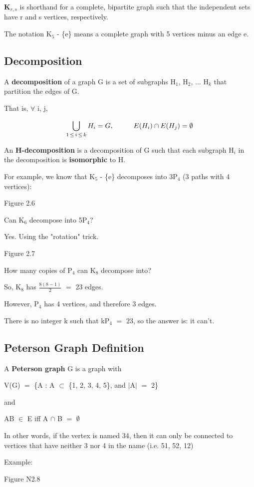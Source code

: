\documentclass{article}
\newcommand{\mt}[1]{\ensuremath{#1}}
\newcommand\ssc[2][\DefaultOpt]{%
  \def\DefaultOpt{#2}%
  \subsection[#1]{#2}%
}
\newcommand{\fa}{\mt{\forall} }          %
\newcommand{\mem}{\mt{\in} }
\newcommand{\es}{\mt{\emptyset} }        %
\newcommand{\sbs}{\mt{\subset} }         %
\newcommand{\av}[1]{\mt{|}#1\mt{|}}  %
\newcommand{\bk}[1]{\{#1\}}
\newcommand{\ms}{\mt{\operatorname{-}} }
\newcommand{\lse}{\mt{\operatorname{\leq}} }
\newcommand{\eql}{ \mt{\operatorname{=}} }
\newcommand{\uw}[2]{#1\mt{_{#2}}}
\newcommand{\frc}[2]{\mt{\frac{#1}{#2}}}
\newcommand{\eqn}[1]{\[#1\]}
\newcommand\tab[1][1cm]{\hspace*{#1}}
\begin{document}
\textbf{\uw{K}{r, s}} is shorthand for a complete, bipartite graph such that the independent sets have r and s vertices, respectively.

The notation \uw{K}{5} \ms \bk{e} means a complete graph with 5 vertices minus an edge e.

\ssc{Decomposition}{

A \textbf{decomposition} of a graph G is a set of subgraphs \uw{H}{1}, \uw{H}{2}, ... \uw{H}{k} that partition the edges of G.

That is, \fa i, j,

\eqn{\bigcup_{1\lse i\lse k}\uw{H}{i} = G,\tab E(H_i) \cap E(H_j) = \es}

An \textbf{H-decomposition} is a decomposition of G such that each subgraph \uw{H}{i} in the decomposition is \textbf{isomorphic} to H.

For example, we know that \uw{K}{5} \ms \bk{e} decomposes into 3\uw{P}{4} (3 paths with 4 vertices):

Figure 2.6

Can \uw{K}{6} decompose into 5\uw{P}{4}?

Yes. Using the "rotation" trick.

Figure 2.7

How many copies of \uw{P}{4} can \uw{K}{8} decompose into?

So, \uw{K}{8} has \frc{8(8 - 1)}{2} \eql 23 edges.

However, \uw{P}{4} has 4 vertices, and therefore 3 edges.

There is no integer k such that k\uw{P}{4} \eql 23, so the answer is: it can't.
}

\ssc{Peterson Graph Definition}{

A \textbf{Peterson graph} G is a graph with

V(G) \eql \bk{A : A \sbs \bk{1, 2, 3, 4, 5}, and \av{A} \eql 2}

and

AB \mem E iff A $\cap$ B \eql \es

In other words, if the vertex is named 34, then it can only be connected to vertices that have neither 3 nor 4 in the name (i.e. 51, 52, 12)

Example:

Figure N2.8

}

\newpage
\end{document}
